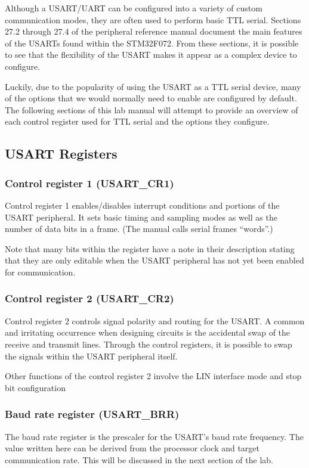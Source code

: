 \documentclass[openany,11pt,fleqn]{book} %
\begin{document}
Although a USART/UART can be configured into a variety of custom communication modes, they are often used to perform basic TTL serial. Sections 27.2 through 27.4 of the peripheral reference manual document the main features of the USARTs found within the STM32F072. From these sections, it is possible to see that the flexibility of the USART makes it appear as a complex device to configure. 

Luckily, due to the popularity of using the USART as a TTL serial device, many of the options that we would normally need to enable are configured by default. The following sections of this lab manual will attempt to provide an overview of each control register used for TTL serial and the options they configure. 

\subsection{USART Registers}	

\subsubsection{Control register 1 (USART\_CR1)}
Control register 1 enables/disables interrupt conditions and portions of the USART peripheral. It sets basic timing and sampling modes as well as the number of data bits in a frame. (The manual calls serial frames ``words''.) 

Note that many bits within the register have a note in their description stating that they are only editable when the USART peripheral has not yet been enabled for communication. 

\subsubsection{Control register 2 (USART\_CR2)}
Control register 2 controls signal polarity and routing for the USART. A common and irritating occurrence when designing circuits is the accidental swap of the receive and transmit lines. Through the control registers, it is possible to swap the signals within the USART peripheral itself. 

Other functions of the control register 2 involve the LIN interface mode and stop bit configuration 

\subsubsection{Baud rate register (USART\_BRR)}
The baud rate register is the prescaler for the USART's baud rate frequency. The value written here can be derived from the processor clock and target communication rate. This will be discussed in the next section of the lab.
\end{document}
